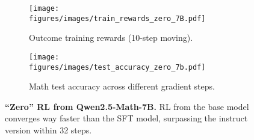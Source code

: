 \begin{figure*}[tbh]
    \centering
    \begin{subfigure}{0.42\textwidth}
        \centering
        \texttt{[image: figures/images/train\_rewards\_zero\_7B.pdf]}
        \caption{Outcome training rewards (10-step moving).} %
    \end{subfigure}
    \hfill %
    \begin{subfigure}{0.57\textwidth}
        \centering
        \texttt{[image: figures/images/test\_accuracy\_zero\_7b.pdf]}
        \caption{Math test accuracy across different gradient steps.} %
    \end{subfigure}
    \caption{\textbf{``Zero'' RL from Qwen2.5-Math-7B.} RL from the base model converges way faster than the SFT model, surpassing the instruct version within 32 steps.} %
    \label{fig:zero_7}
\end{figure*}
